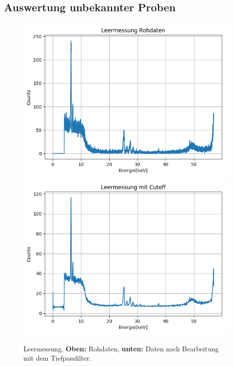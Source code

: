 \documentclass[12pt,a4paper]{article}
\begin{document}
\subsection{Auswertung unbekannter Proben}
\begin{figure}
\centering
\includegraphics[scale=0.8]{Bilder/alpha_spektren/leer_roh.png}
\includegraphics[scale=0.8]{Bilder/alpha_spektren/leer_cut.png}
\caption{Leermessung. \textbf{Oben:} Rohdaten, \textbf{unten:} Daten nach Bearbeitung mit dem Tiefpassfilter.}
\label{fig:a_prob_leer}
\end{figure}
\end{document}
